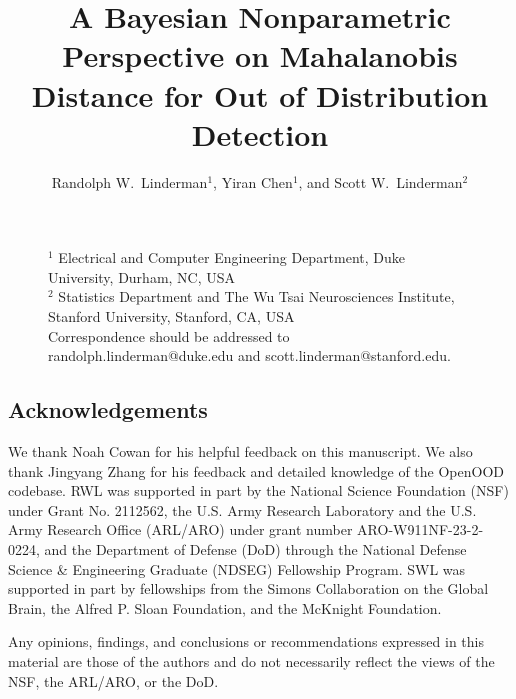 \documentclass[11pt]{article}
\title{A Bayesian Nonparametric Perspective on Mahalanobis Distance for Out of Distribution Detection}
\author{
  Randolph W.~Linderman$^{1}$, Yiran Chen$^{1}$, and Scott W.~Linderman$^{2}$
}
\begin{document}
\maketitle

\begin{figure}[!b]
\begin{minipage}[l]{\textwidth}
\footnotesize
$^{1}$ Electrical and Computer Engineering Department, Duke University, Durham, NC, USA\\[-0.5ex]
$^{2}$ Statistics Department and The Wu Tsai Neurosciences Institute, Stanford University, Stanford, CA, USA\\[-0.5ex]
Correspondence should be addressed to randolph.linderman@duke.edu and scott.linderman@stanford.edu.
\end{minipage}
\end{figure}










\subsection*{Acknowledgements}
We thank Noah Cowan for his helpful feedback on this manuscript. We also thank Jingyang Zhang for his feedback and detailed knowledge of the OpenOOD codebase.
RWL was supported in part by the National Science Foundation (NSF) under Grant No.
2112562, the U.S. Army Research Laboratory and the U.S. Army Research Office (ARL/ARO)
under grant number ARO-W911NF-23-2-0224, and the Department of Defense (DoD) through the National Defense Science \& Engineering Graduate (NDSEG) Fellowship Program.
SWL was supported in part by fellowships from the Simons Collaboration on the Global Brain, the Alfred P. Sloan Foundation, and the McKnight Foundation.

Any opinions, findings, and conclusions or recommendations expressed in this
material are those of the authors and do not necessarily reflect the views of
the NSF, the ARL/ARO, or the DoD.




\clearpage
\appendix

\end{document}
